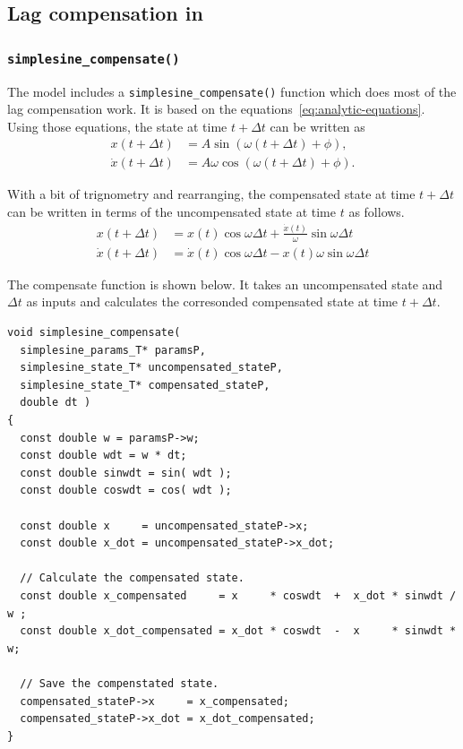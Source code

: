 \subsection{Lag compensation in \simplesine}
\subsubsection{\tt simplesine\_compensate()}

The \simplesine model includes a {\tt simplesine\_compensate()} function
which does most of the lag compensation work.
It is based on the equations~\ref{eq:analytic-equations}.
Using those equations, the state at time $t + \Delta t$ can be written as
\begin{subequations}
\label{eq:analytic-compensation-equations}
\begin{align}
x(t + \Delta t)       &= A        \sin {(\omega (t + \Delta t) + \phi)}, \\
\dot{x}(t + \Delta t) &= A \omega \cos {(\omega (t + \Delta t) + \phi)}.
\end{align}
\end{subequations}

With a bit of trignometry and rearranging, the compensated state at time
$t + \Delta t$ can be written in terms of the uncompensated state at time $t$
as follows.
\begin{subequations}
\label{eq:analytic-compensation-equations-2}
\begin{align}
x(t + \Delta t)
  &=
    x(t)       \cos {\omega \Delta t}
    +
    \frac{\dot{x}(t)}{\omega} \sin { \omega \Delta t}
  \\
\dot{x}(t + \Delta t)
  &=
    \dot{x}(t) \cos {\omega \Delta t}
    -
    x(t) \omega \sin { \omega \Delta t}
\end{align}
\end{subequations}

The compensate function is shown below.
It takes an uncompensated state and $\Delta t$ as inputs
and calculates the corresonded compensated state at time $t + \Delta t$.

\begin{lstlisting}[caption={The {\tt simplesine\_compensate} function},label={list:simplesine-compensate}]
void simplesine_compensate(
  simplesine_params_T* paramsP,
  simplesine_state_T* uncompensated_stateP,
  simplesine_state_T* compensated_stateP,
  double dt )
{
  const double w = paramsP->w;
  const double wdt = w * dt;
  const double sinwdt = sin( wdt );
  const double coswdt = cos( wdt );

  const double x     = uncompensated_stateP->x;
  const double x_dot = uncompensated_stateP->x_dot;

  // Calculate the compensated state.
  const double x_compensated     = x     * coswdt  +  x_dot * sinwdt / w ;
  const double x_dot_compensated = x_dot * coswdt  -  x     * sinwdt * w;

  // Save the compenstated state.
  compensated_stateP->x     = x_compensated;
  compensated_stateP->x_dot = x_dot_compensated;
}
\end{lstlisting}

